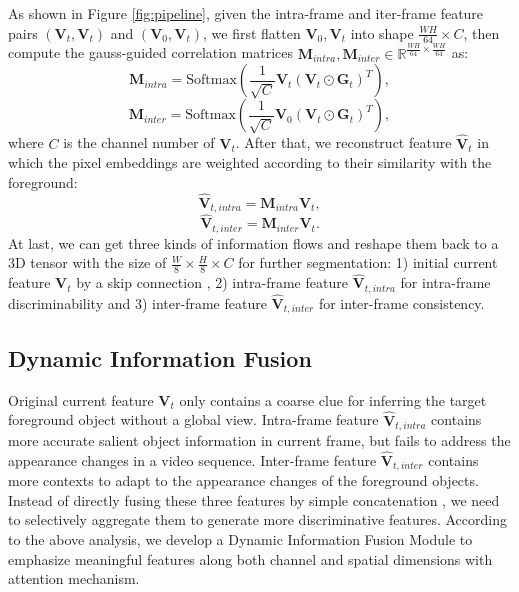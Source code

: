 \documentclass[letterpaper]{article} \usepackage{aaai20}  \usepackage{times}  \usepackage{helvet} \usepackage{courier}  \usepackage[hyphens]{url}  \usepackage{graphicx} \urlstyle{rm} \def\UrlFont{\rm}  \usepackage{graphicx}  \frenchspacing  \setlength{\pdfpagewidth}{8.5in}  \setlength{\pdfpageheight}{11in}  \usepackage{amssymb}
\begin{document}
As shown in Figure \ref{fig:pipeline}, 
given the intra-frame and iter-frame feature pairs $(\bm{V}_t,\bm{V}_t)$ and $(\bm{V}_0,\bm{V}_t)$, we first flatten $\bm{V}_0,\bm{V}_t$ into shape $\frac{WH}{64} \times C$, then compute the gauss-guided correlation matrices $\bm{M}_{intra},\bm{M}_{inter} \in \mathbb{R}^{\frac{WH}{64} \times \frac{WH}{64}}$ as:
\begin{equation}
    \bm{M}_{intra} = \text{Softmax}(\frac{1}{\sqrt{C}}\bm{V}_t(\bm{V}_t\odot \bm{G}_t)^T),
\end{equation}
\begin{equation}
    \bm{M}_{inter} = \text{Softmax}(\frac{1}{\sqrt{C}}\bm{V}_0(\bm{V}_t\odot \bm{G}_t)^T),
\end{equation}
where $C$ is the channel number of $\bm{V}_t$. After that, we reconstruct feature $\hat{\bm{V}}_t$ in which the pixel embeddings are weighted according to their similarity with the
foreground:
\begin{equation}
    \hat{\bm{V}}_{t,intra} = \bm{M}_{intra} \bm{V}_t,
\end{equation}
\begin{equation}
    \hat{\bm{V}}_{t,inter} = \bm{M}_{inter} \bm{V}_t.
\end{equation}
At last, we can get three kinds of information flows and reshape them back to a 3D tensor with the size of $\frac{W}{8} \times \frac{H}{8} \times C$ for further segmentation: 1) initial current feature $\bm{V}_t$ by a skip connection \cite{he2016deep}, 2) intra-frame feature $\hat{\bm{V}}_{t,intra}$ for intra-frame discriminability and 3) inter-frame feature $\hat{\bm{V}}_{t,inter}$ for inter-frame consistency.

\subsection{Dynamic Information Fusion}
Original current feature $\bm{V}_t$ only contains a coarse clue for inferring the target foreground object without a global view. Intra-frame feature $\hat{\bm{V}}_{t,intra}$ contains more accurate salient object information in current frame, but fails to address the appearance changes in a video sequence. Inter-frame feature $\hat{\bm{V}}_{t,inter}$ contains more contexts to adapt to the appearance changes of the foreground objects. Instead of directly fusing these three features by simple concatenation \cite{lu2019see,yang2019anchor}, we need to selectively aggregate them to generate more discriminative features. According to the above analysis, 
we develop a Dynamic Information Fusion Module to emphasize meaningful features along both channel and spatial dimensions with attention mechanism.
\end{document}
